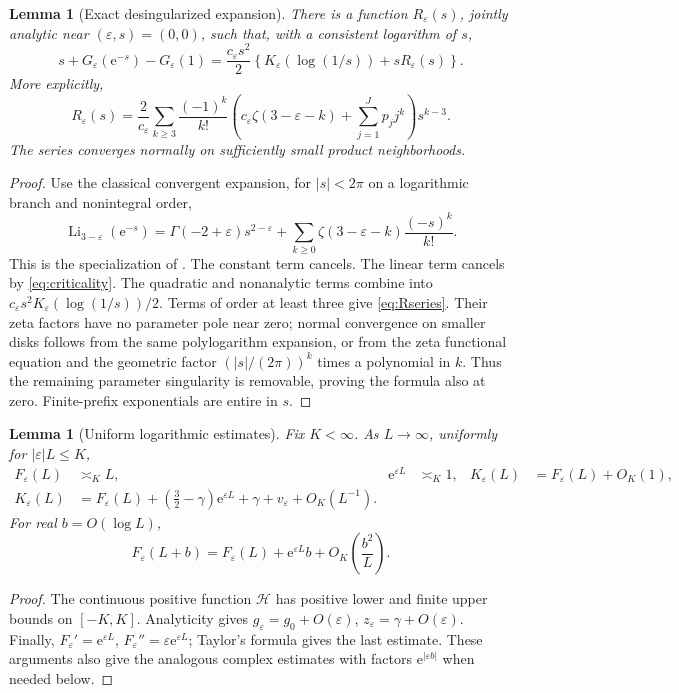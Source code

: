 \documentclass[11pt,a4paper]{article}
\numberwithin{equation}{section}
\newtheorem{lemma}[theorem]{Lemma}
\theoremstyle{definition}
\theoremstyle{remark}
\newcommand{\eps}{\varepsilon}
\newcommand{\Li}{\operatorname{Li}}
\newcommand{\ee}{\mathrm e}
\newcommand{\hc}{\mathcal H}
\newcommand{\FF}{F_{\eps}}
\newcommand{\KK}{K_{\eps}}
\begin{document}
\begin{lemma}[Exact desingularized expansion]
\label{lem:kernel}
There is a function \(R_{\eps}(s)\), jointly analytic near
\((\eps,s)=(0,0)\), such that, with a consistent logarithm of \(s\),
\begin{equation}
 s+G_{\eps}(\ee^{-s})-G_{\eps}(1)
 =\frac{c_{\eps}s^2}{2}
   \left\{\KK(\log(1/s))+sR_{\eps}(s)\right\}.
 \label{eq:exact-delta-kernel}
\end{equation}
More explicitly,
\begin{equation}
 R_{\eps}(s)=\frac2{c_{\eps}}
 \sum_{k\ge3}\frac{(-1)^k}{k!}
 \left(c_{\eps}\zeta(3-\eps-k)+\sum_{j=1}^Jp_jj^k\right)s^{k-3}.
 \label{eq:Rseries}
\end{equation}
The series converges normally on sufficiently small product neighborhoods.
\end{lemma}
\begin{proof}
Use the classical convergent expansion, for \(|s|<2\pi\) on a logarithmic
branch and nonintegral order,
\[
 \Li_{3-\eps}(\ee^{-s})
 =\Gamma(-2+\eps)s^{2-\eps}
   +\sum_{k\ge0}\zeta(3-\eps-k)\frac{(-s)^k}{k!}.
\]
This is the specialization of \cite[Eq. 25.12.12]{dlmf-polylog}.
The constant term cancels. The linear term cancels by
\eqref{eq:criticality}. The quadratic and nonanalytic terms combine into
\(c_{\eps}s^2\KK(\log(1/s))/2\). Terms of order at least three give
\eqref{eq:Rseries}. Their zeta factors have no parameter pole near zero;
normal convergence on smaller disks follows from the same polylogarithm
expansion, or from the zeta functional equation and the geometric factor
\((|s|/(2\pi))^k\) times a polynomial in \(k\).
Thus the remaining parameter singularity is removable, proving the formula
also at zero. Finite-prefix exponentials are entire in \(s\).
\end{proof}

\begin{lemma}[Uniform logarithmic estimates]
\label{lem:log-estimates}
Fix \(K<\infty\). As \(L\to\infty\), uniformly for \(|\eps|L\le K\),
\begin{align}
 \FF(L)&\asymp_K L,& \ee^{\eps L}&\asymp_K1,
 &\KK(L)&=\FF(L)+O_K(1),\label{eq:kernel-estimates}\\
 \KK(L)&=\FF(L)+(\tfrac32-\gamma)\ee^{\eps L}
                  +\gamma+v_{\eps}+O_K(L^{-1}).\label{eq:kernel-two-term}
\end{align}
For real \(b=O(\log L)\),
\begin{equation}
 \FF(L+b)=\FF(L)+\ee^{\eps L}b
     +O_K\left(\frac{b^2}{L}\right).
 \label{eq:F-shift}
\end{equation}
\end{lemma}
\begin{proof}
The continuous positive function \(\hc\) has positive lower and finite upper
bounds on \([-K,K]\). Analyticity gives
\(g_{\eps}=g_0+O(\eps)\), \(z_{\eps}=\gamma+O(\eps)\).
Finally, \(\FF'=\ee^{\eps L}\), \(\FF''=\eps\ee^{\eps L}\);
Taylor's formula gives the last estimate. These arguments also give the
analogous complex estimates with factors
\(\ee^{|\eps b|}\) when needed below.
\end{proof}
\end{document}
